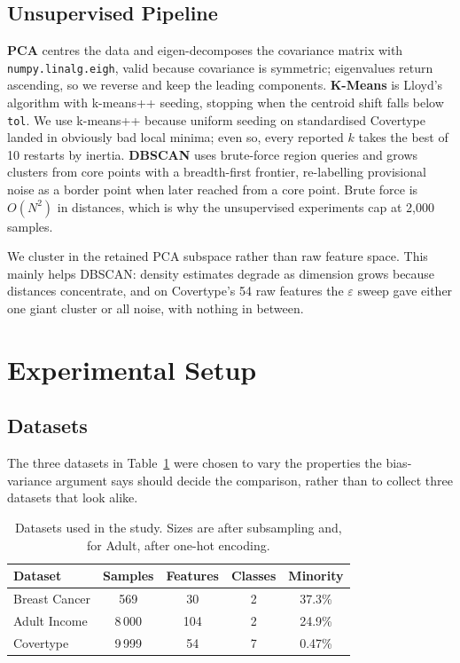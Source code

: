 \documentclass[conference]{IEEEtran}
\begin{document}
\subsection{Unsupervised Pipeline}
\textbf{PCA} centres the data and eigen-decomposes the covariance matrix
with \texttt{numpy.linalg.eigh}, valid because covariance is symmetric;
eigenvalues return ascending, so we reverse and keep the leading
components.  \textbf{K-Means} is Lloyd's algorithm with k-means++ seeding,
stopping when the centroid shift falls below \texttt{tol}.  We use
k-means++ because uniform seeding on standardised Covertype landed in
obviously bad local minima; even so, every reported $k$ takes the best of
10 restarts by inertia.  \textbf{DBSCAN} uses brute-force region queries
and grows clusters from core points with a breadth-first frontier,
re-labelling provisional noise as a border point when later reached from a
core point.  Brute force is $O(N^2)$ in distances, which is why the
unsupervised experiments cap at 2{,}000 samples.

We cluster in the retained PCA subspace rather than raw feature space.
This mainly helps DBSCAN: density estimates degrade as dimension grows
because distances concentrate, and on Covertype's 54 raw features the
$\varepsilon$ sweep gave either one giant cluster or all noise, with
nothing in between.

\section{Experimental Setup}
\label{sec:experiments}
\subsection{Datasets}
The three datasets in Table~\ref{tab:datasets} were chosen to vary the
properties the bias-variance argument says should decide the comparison,
rather than to collect three datasets that look alike.

\begin{table}[t]
\centering
\caption{Datasets used in the study.  Sizes are after subsampling and,
for Adult, after one-hot encoding.}
\label{tab:datasets}
\begin{tabular}{lcccc}
\toprule
\textbf{Dataset} & \textbf{Samples} & \textbf{Features} & \textbf{Classes}
  & \textbf{Minority}\\
\midrule
Breast Cancer & 569 & 30 & 2 & 37.3\%\\
Adult Income & 8\,000 & 104 & 2 & 24.9\%\\
Covertype & 9\,999 & 54 & 7 & 0.47\%\\
\bottomrule
\end{tabular}
\end{table}
\end{document}
